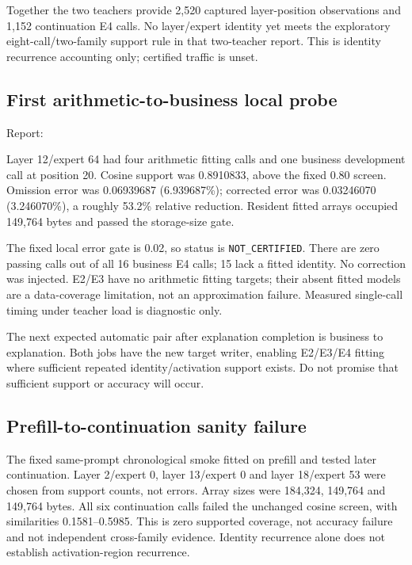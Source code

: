\documentclass[11pt,a4paper]{article}
\begin{document}
Together the two teachers provide 2,520 captured layer-position observations
and 1,152 continuation E4 calls. No layer/expert identity yet meets the
exploratory eight-call/two-family support rule in that two-teacher report.
This is identity recurrence accounting only; certified traffic is unset.

\subsection{First arithmetic-to-business local probe}
Report:
\begin{quote}\end{quote}
Layer 12/expert 64 had four arithmetic fitting calls and one business
development call at position 20. Cosine support was 0.8910833, above the fixed
0.80 screen. Omission error was 0.06939687 (6.939687\%); corrected error was
0.03246070 (3.246070\%), a roughly 53.2\% relative reduction. Resident fitted
arrays occupied 149,764 bytes and passed the storage-size gate.

The fixed local error gate is 0.02, so status is \texttt{NOT\_CERTIFIED}.
There are zero passing calls out of all 16 business E4 calls; 15 lack a fitted
identity. No correction was injected. E2/E3 have no arithmetic fitting targets;
their absent fitted models are a data-coverage limitation, not an approximation
failure. Measured single-call timing under teacher load is diagnostic only.

The next expected automatic pair after explanation completion is business to
explanation. Both jobs have the new target writer, enabling E2/E3/E4 fitting
where sufficient repeated identity/activation support exists. Do not promise
that sufficient support or accuracy will occur.

\subsection{Prefill-to-continuation sanity failure}
The fixed same-prompt chronological smoke fitted on prefill and tested later
continuation. Layer 2/expert 0, layer 13/expert 0 and layer 18/expert 53 were
chosen from support counts, not errors. Array sizes were 184,324, 149,764 and
149,764 bytes. All six continuation calls failed the unchanged cosine screen,
with similarities 0.1581--0.5985. This is zero supported coverage, not accuracy
failure and not independent cross-family evidence. Identity recurrence alone
does not establish activation-region recurrence.
\end{document}
